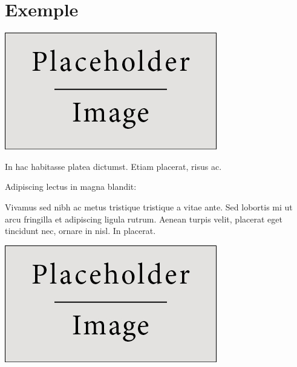 \documentclass[a0,portrait]{a0poster}
\begin{document}

\section*{Exemple}


\begin{center}\vspace{1cm}
\includegraphics[width=0.8\linewidth]{placeholder}
\end{center}\vspace{1cm}

In hac habitasse platea dictumst. Etiam placerat, risus ac.

Adipiscing lectus in magna blandit:


Vivamus sed nibh ac metus tristique tristique a vitae ante. Sed lobortis mi ut arcu fringilla et adipiscing ligula rutrum. Aenean turpis velit, placerat eget tincidunt nec, ornare in nisl. In placerat.

\begin{center}\vspace{1cm}
\includegraphics[width=0.8\linewidth]{placeholder}
\end{center}\vspace{1cm}
\end{document}
